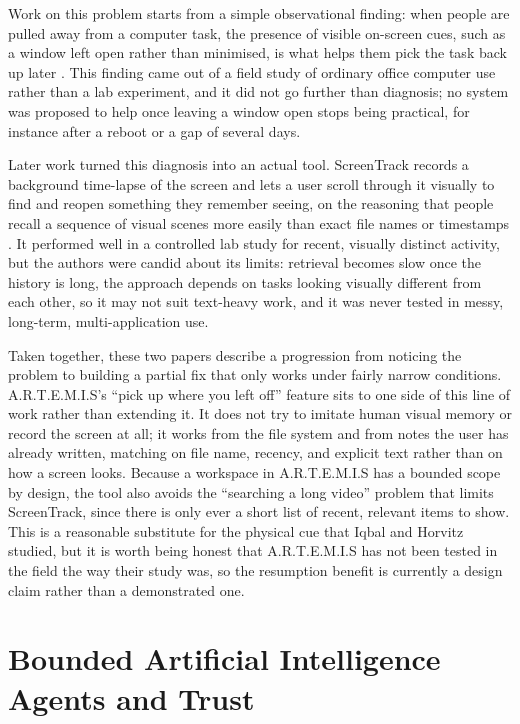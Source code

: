 \documentclass[11pt,a4paper]{report}
\newcommand{\artemis}{A.R.T.E.M.I.S}
\begin{document}
Work on this problem starts from a simple observational finding: when
people are pulled away from a computer task, the presence of visible
on-screen cues, such as a window left open rather than minimised, is
what helps them pick the task back up later \autocite{iqbal2007disruption}.
This finding came out of a field study of ordinary office computer use
rather than a lab experiment, and it did not go further than
diagnosis; no system was proposed to help once leaving a window open
stops being practical, for instance after a reboot or a gap of several
days.

Later work turned this diagnosis into an actual tool. ScreenTrack
records a background time-lapse of the screen and lets a user scroll
through it visually to find and reopen something they remember
seeing, on the reasoning that people recall a sequence of visual
scenes more easily than exact file names or timestamps
\autocite{hu2020screentrack}. It performed well in a controlled lab
study for recent, visually distinct activity, but the authors were
candid about its limits: retrieval becomes slow once the history is
long, the approach depends on tasks looking visually different from
each other, so it may not suit text-heavy work, and it was never
tested in messy, long-term, multi-application use.

Taken together, these two papers describe a progression from noticing
the problem to building a partial fix that only works under fairly
narrow conditions. \artemis{}'s ``pick up where you left off'' feature
sits to one side of this line of work rather than extending it. It
does not try to imitate human visual memory or record the screen at
all; it works from the file system and from notes the user has
already written, matching on file name, recency, and explicit text
rather than on how a screen looks. Because a workspace in \artemis{}
has a bounded scope by design, the tool also avoids the ``searching a
long video'' problem that limits ScreenTrack, since there is only ever
a short list of recent, relevant items to show. This is a reasonable
substitute for the physical cue that Iqbal and Horvitz studied, but it
is worth being honest that \artemis{} has not been tested in the field
the way their study was, so the resumption benefit is currently a
design claim rather than a demonstrated one.

\section{Bounded Artificial Intelligence Agents and Trust}
\end{document}
